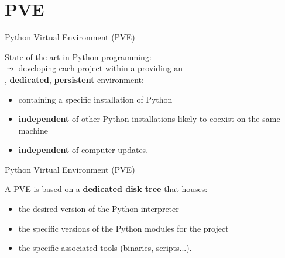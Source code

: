 \documentclass[11pt, serif, mathserif, compress]{beamer}  %
\begin{document}
\section{PVE}

\begin{frame}{Python Virtual Environment (PVE)}
  \vspace*{-3mm}
  \begin{tcolorbox}[title=Interest of a PVE, add to width=7mm]
    State of the art in Python programming:\\
    $\leadsto$ developing each project within a  providing an\\
    \phantom{$\leadsto$ }{\bf isolated}, {\bf dedicated}, {\bf persistent} environment:
    \medskip
    \begin{itemize}\setlength\itemsep{5mm}
    \item<2-> containing a specific installation of Python  
    \item<3-> {\bf independent} of other Python installations likely to coexist on the same machine
    \item<4-> {\bf independent} of computer updates. 
    \end{itemize}
  \end{tcolorbox}
    
\end{frame}

\begin{frame}{Python Virtual Environment (PVE)}
  \vspace*{-3mm}
  \begin{tcolorbox}[title=A simple implementation..., add to width=7mm]
    A PVE is based on a {\bf dedicated disk tree} that houses:
    \medskip
    \begin{itemize}\setlength\itemsep{4mm}
    \item<2-> the desired version of the Python interpreter 
    \item<3-> the specific versions of the Python modules for the project
    \item<4-> the specific associated tools (binaries, scripts...).
    \end{itemize}
  \end{tcolorbox}

  
\end{frame}
\end{document}
